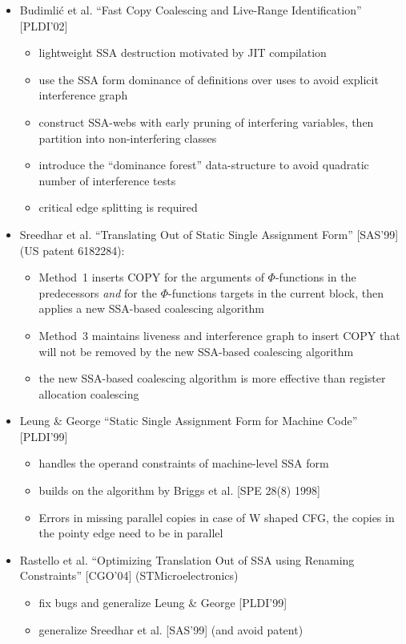 \begin{itemize}

\item Budimli\'c et al. ``Fast Copy Coalescing and Live-Range Identification''
[PLDI'02]

\begin{itemize}
\item lightweight SSA destruction motivated by JIT compilation
\item use the SSA form dominance of definitions over uses to avoid explicit
interference graph
\item construct SSA-webs with early pruning of interfering variables, then
partition into non-interfering classes
\item introduce the ``dominance forest'' data-structure to avoid quadratic
number of interference tests
\item critical edge splitting is required
\end{itemize}

\item Sreedhar et al. ``Translating Out of Static Single Assignment Form''
[SAS'99] (US patent 6182284):

\begin{itemize}
\item Method~1 inserts COPY for the arguments of $\Phi$-functions in the
predecessors \emph{and} for the $\Phi$-functions targets in the current block,
then applies a new SSA-based coalescing algorithm
\item Method~3 maintains liveness and interference graph to insert COPY that will not
be removed by the new SSA-based coalescing algorithm
\item the new SSA-based coalescing algorithm is more effective than register allocation
coalescing
\end{itemize}

\item Leung \& George ``Static Single Assignment Form for Machine Code'' [PLDI'99]

\begin{itemize}
\item handles the operand constraints of machine-level SSA form
\item builds on the algorithm by Briggs et al. [SPE 28(8) 1998]
\item Errors in missing parallel copies in case of W shaped CFG, the copies in
the pointy edge need to be in parallel
\end{itemize}

\item Rastello et al. ``Optimizing Translation Out of SSA using Renaming
Constraints'' [CGO'04] (STMicroelectronics)
\begin{itemize}
\item fix bugs and generalize Leung \& George [PLDI'99]
\item generalize Sreedhar et al. [SAS'99] (and avoid patent)
\end{itemize}

\end{itemize}


